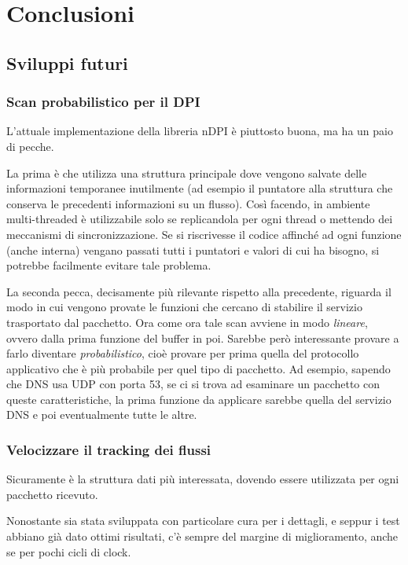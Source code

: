 \clearpage{\pagestyle{empty}\cleardoublepage}
\chapter{Conclusioni}

\section{Sviluppi futuri}

\subsection{Scan probabilistico per il DPI}

L'attuale implementazione della libreria nDPI è piuttosto buona, ma ha un paio di pecche.

La prima è che utilizza una struttura principale dove vengono salvate delle informazioni temporanee inutilmente (ad esempio il puntatore alla struttura che conserva le precedenti informazioni su un flusso). Così facendo, in ambiente multi-threaded è utilizzabile solo se replicandola per ogni thread o mettendo dei meccanismi di sincronizzazione. Se si riscrivesse il codice affinché ad ogni funzione (anche interna) vengano passati tutti i puntatori e valori di cui ha bisogno, si potrebbe facilmente evitare tale problema.

La seconda pecca, decisamente più rilevante rispetto alla precedente, riguarda il modo in cui vengono provate le funzioni che cercano di stabilire il servizio trasportato dal pacchetto. Ora come ora tale scan avviene in modo \emph{lineare}, ovvero dalla prima funzione del buffer in poi. Sarebbe però interessante provare a farlo diventare \emph{probabilistico}, cioè provare per prima quella del protocollo applicativo che è più probabile per quel tipo di pacchetto. Ad esempio, sapendo che DNS usa UDP con porta 53, se ci si trova ad esaminare un pacchetto con queste caratteristiche, la prima funzione da applicare sarebbe quella del servizio DNS e poi eventualmente tutte le altre.

\subsection{Velocizzare il tracking dei flussi}

Sicuramente è la struttura dati più interessata, dovendo essere utilizzata per ogni pacchetto ricevuto.

Nonostante sia stata sviluppata con particolare cura per i dettagli, e seppur i test abbiano già dato ottimi risultati, c'è sempre del margine di miglioramento, anche se per pochi cicli di clock.

